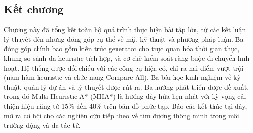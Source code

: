\documentclass[../BTL.tex]{subfiles}
\begin{document}
\subsection*{Kết chương}

Chương này đã tổng kết toàn bộ quá trình thực hiện bài tập lớn, từ các kết luận lý thuyết đến những đóng góp cụ thể về mặt kỹ thuật và phương pháp luận. Ba đóng góp chính bao gồm kiến trúc generator cho trực quan hóa thời gian thực, khung so sánh đa heuristic tích hợp, và cơ chế kiểm soát ràng buộc di chuyển linh hoạt. Hệ thống được đối chiếu với các công cụ hiện có, chỉ ra hai điểm vượt trội (năm hàm heuristic và chức năng Compare All). Ba bài học kinh nghiệm về kỹ thuật, quản lý dự án và lý thuyết được rút ra. Ba hướng phát triển được đề xuất, trong đó Multi-Heuristic A* (MHA*) là hướng đầy hứa hẹn nhất với kỳ vọng cải thiện hiệu năng từ 15\% đến 40\% trên bản đồ phức tạp. Báo cáo kết thúc tại đây, mở ra cơ hội cho các nghiên cứu tiếp theo về tìm đường thông minh trong môi trường động và đa tác tử.
\end{document}
